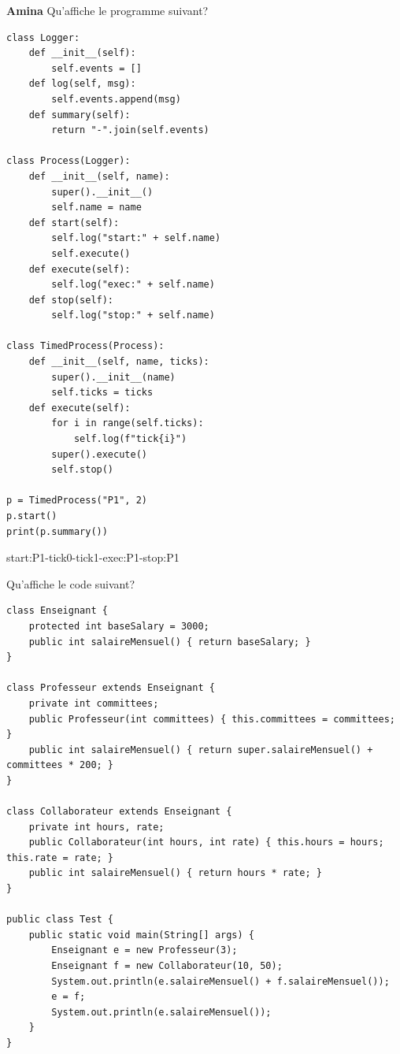 \begin{Exercice}[5 minutes]\textbf{Amina}
Qu'affiche le programme suivant?

\begin{lstlisting}[style=pythonstyle]
class Logger:
    def __init__(self):
        self.events = []
    def log(self, msg):
        self.events.append(msg)
    def summary(self):
        return "-".join(self.events)

class Process(Logger):
    def __init__(self, name):
        super().__init__()
        self.name = name
    def start(self):
        self.log("start:" + self.name)
        self.execute()
    def execute(self):
        self.log("exec:" + self.name)
    def stop(self):
        self.log("stop:" + self.name)

class TimedProcess(Process):
    def __init__(self, name, ticks):
        super().__init__(name)
        self.ticks = ticks
    def execute(self):
        for i in range(self.ticks):
            self.log(f"tick{i}")
        super().execute()
        self.stop()

p = TimedProcess("P1", 2)
p.start()
print(p.summary())
\end{lstlisting}

\begin{solution}
start:P1-tick0-tick1-exec:P1-stop:P1
\end{solution}

Qu'affiche le code suivant?

\begin{lstlisting}[style=javastyle]
class Enseignant {
    protected int baseSalary = 3000;
    public int salaireMensuel() { return baseSalary; }
}

class Professeur extends Enseignant {
    private int committees;
    public Professeur(int committees) { this.committees = committees; }
    public int salaireMensuel() { return super.salaireMensuel() + committees * 200; }
}

class Collaborateur extends Enseignant {
    private int hours, rate;
    public Collaborateur(int hours, int rate) { this.hours = hours; this.rate = rate; }
    public int salaireMensuel() { return hours * rate; }
}

public class Test {
    public static void main(String[] args) {
        Enseignant e = new Professeur(3);
        Enseignant f = new Collaborateur(10, 50);
        System.out.println(e.salaireMensuel() + f.salaireMensuel());
        e = f;
        System.out.println(e.salaireMensuel());
    }
}
\end{lstlisting}


\end{Exercice}
